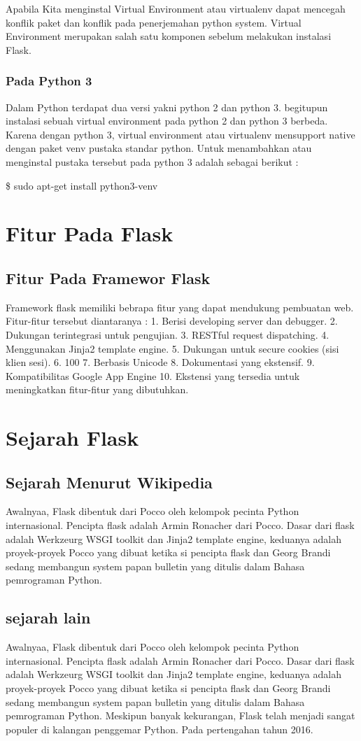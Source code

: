 \documentclass[12pt,a4paper]{article}
\begin{document}
Apabila Kita menginstal Virtual Environment atau virtualenv dapat mencegah konflik paket dan konflik pada penerjemahan python system. Virtual Environment merupakan salah satu komponen sebelum melakukan instalasi Flask.
\subsubsection{Pada Python 3}
Dalam Python terdapat dua versi yakni python 2 dan python 3. begitupun instalasi sebuah virtual environment pada python 2 dan python 3 berbeda. Karena dengan python 3, virtual environment atau virtualenv mensupport native dengan paket venv pustaka standar python. Untuk menambahkan atau menginstal pustaka tersebut pada python 3 adalah sebagai berikut :

\$ sudo apt-get install python3-venv

\section{Fitur Pada Flask}
\subsection{Fitur Pada Framewor Flask}
Framework flask memiliki bebrapa fitur yang dapat mendukung pembuatan web. Fitur-fitur tersebut diantaranya : 
1.	Berisi developing server dan debugger.
2.	Dukungan terintegrasi untuk pengujian.
3.	RESTful request dispatching.
4.	Menggunakan Jinja2 template engine.
5.	Dukungan untuk secure cookies (sisi klien sesi).
6.	100%
7.	Berbasis Unicode
8.	Dokumentasi yang ekstensif.
9.	Kompatibilitas Google App Engine
10.	Ekstensi yang tersedia untuk meningkatkan fitur-fitur yang dibutuhkan.

\section{Sejarah Flask}
\subsection{Sejarah Menurut Wikipedia}
Awalnyaa, Flask dibentuk dari Pocco oleh kelompok pecinta Python internasional. Pencipta flask adalah Armin Ronacher dari Pocco. Dasar dari flask adalah Werkzeurg WSGI toolkit dan Jinja2 template engine, keduanya adalah proyek-proyek Pocco yang dibuat ketika si pencipta flask dan Georg Brandi sedang membangun system papan bulletin yang ditulis dalam Bahasa pemrograman Python.

\subsection{sejarah lain}
Awalnyaa, Flask dibentuk dari Pocco oleh kelompok pecinta Python internasional. Pencipta flask adalah Armin Ronacher dari Pocco. Dasar dari flask adalah Werkzeurg WSGI toolkit dan Jinja2 template engine, keduanya adalah proyek-proyek Pocco yang dibuat ketika si pencipta flask dan Georg Brandi sedang membangun system papan bulletin yang ditulis dalam Bahasa pemrograman Python. Meskipun banyak kekurangan, Flask telah menjadi sangat populer di kalangan penggemar Python. Pada pertengahan tahun 2016. 
\end{document}
